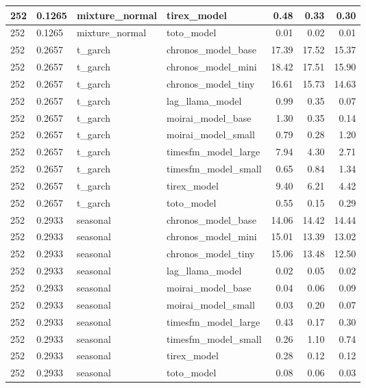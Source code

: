 {\begin{tabular}{llllrrr}
\midrule
252 & 0.1265 & mixture\_normal & tirex\_model & 0.48 & 0.33 & 0.30 \\
\midrule
252 & 0.1265 & mixture\_normal & toto\_model & 0.01 & 0.02 & 0.01 \\
\midrule
252 & 0.2657 & t\_garch & chronos\_model\_base & 17.39 & 17.52 & 15.37 \\
\midrule
252 & 0.2657 & t\_garch & chronos\_model\_mini & 18.42 & 17.51 & 15.90 \\
\midrule
252 & 0.2657 & t\_garch & chronos\_model\_tiny & 16.61 & 15.73 & 14.63 \\
\midrule
252 & 0.2657 & t\_garch & lag\_llama\_model & 0.99 & 0.35 & 0.07 \\
\midrule
252 & 0.2657 & t\_garch & moirai\_model\_base & 1.30 & 0.35 & 0.14 \\
\midrule
252 & 0.2657 & t\_garch & moirai\_model\_small & 0.79 & 0.28 & 1.20 \\
\midrule
252 & 0.2657 & t\_garch & timesfm\_model\_large & 7.94 & 4.30 & 2.71 \\
\midrule
252 & 0.2657 & t\_garch & timesfm\_model\_small & 0.65 & 0.84 & 1.34 \\
\midrule
252 & 0.2657 & t\_garch & tirex\_model & 9.40 & 6.21 & 4.42 \\
\midrule
252 & 0.2657 & t\_garch & toto\_model & 0.55 & 0.15 & 0.29 \\
\midrule
252 & 0.2933 & seasonal & chronos\_model\_base & 14.06 & 14.42 & 14.44 \\
\midrule
252 & 0.2933 & seasonal & chronos\_model\_mini & 15.01 & 13.39 & 13.02 \\
\midrule
252 & 0.2933 & seasonal & chronos\_model\_tiny & 15.06 & 13.48 & 12.50 \\
\midrule
252 & 0.2933 & seasonal & lag\_llama\_model & 0.02 & 0.05 & 0.02 \\
\midrule
252 & 0.2933 & seasonal & moirai\_model\_base & 0.04 & 0.06 & 0.09 \\
\midrule
252 & 0.2933 & seasonal & moirai\_model\_small & 0.03 & 0.20 & 0.07 \\
\midrule
252 & 0.2933 & seasonal & timesfm\_model\_large & 0.43 & 0.17 & 0.30 \\
\midrule
252 & 0.2933 & seasonal & timesfm\_model\_small & 0.26 & 1.10 & 0.74 \\
\midrule
252 & 0.2933 & seasonal & tirex\_model & 0.28 & 0.12 & 0.12 \\
\midrule
252 & 0.2933 & seasonal & toto\_model & 0.08 & 0.06 & 0.03 \\

\end{tabular}}
